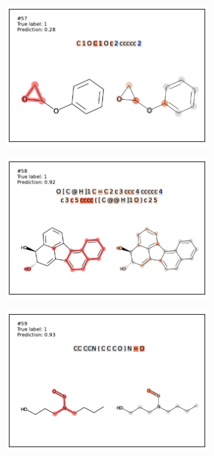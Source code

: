 \begin{figure}
\centering
\begin{subfigure}[b]{0.33\textwidth} 
  \centering 
  \includegraphics[width=\textwidth]{figures/ames/ames57.pdf} 
\end{subfigure}\begin{subfigure}[b]{0.33\textwidth} 
  \centering 
  \includegraphics[width=\textwidth]{figures/ames/ames58.pdf} 
\end{subfigure}\begin{subfigure}[b]{0.33\textwidth} 
  \centering 
  \includegraphics[width=\textwidth]{figures/ames/ames59.pdf} 

\end{subfigure}
\end{figure}
